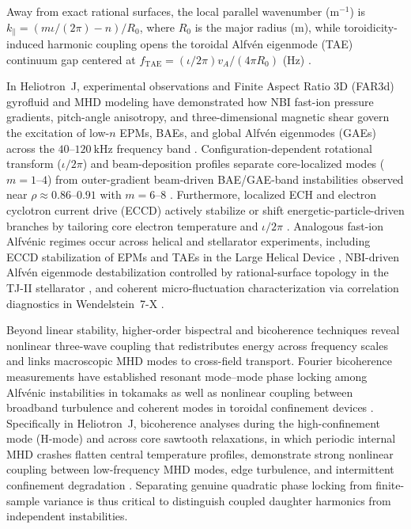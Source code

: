 \noindent Away from exact rational surfaces, the local parallel wavenumber ($\mathrm{m^{-1}}$) is $k_\parallel = (m\iota/(2\pi) - n)/R_0$, where $R_0$ is the major radius ($\mathrm{m}$), while toroidicity-induced harmonic coupling opens the toroidal Alfv\'en eigenmode (TAE) continuum gap centered at $f_{\mathrm{TAE}} = (\iota/2\pi)v_A/(4\pi R_0)$ ($\mathrm{Hz}$) \cite{Heidbrink2008, chen2016introduction, Varela2015}.

In Heliotron~J, experimental observations and Finite Aspect Ratio 3D (FAR3d) gyrofluid and MHD modeling have demonstrated how NBI fast-ion pressure gradients, pitch-angle anisotropy, and three-dimensional magnetic shear govern the excitation of low-$n$ EPMs, BAEs, and global Alfv\'en eigenmodes (GAEs) across the $40\text{--}120~\mathrm{kHz}$ frequency band \cite{Yamamoto_2020, Varela2015, Varela2024, Zhong2024}. Configuration-dependent rotational transform ($\iota/2\pi$) and beam-deposition profiles separate core-localized modes ($m = 1\text{--}4$) from outer-gradient beam-driven BAE/GAE-band instabilities observed near $\rho \approx 0.86\text{--}0.91$ with $m = 6\text{--}8$ \cite{zang2019observation, Varela2023, Zhong2024}. Furthermore, localized ECH and electron cyclotron current drive (ECCD) actively stabilize or shift energetic-particle-driven branches by tailoring core electron temperature and $\iota/2\pi$ \cite{zang2019observation, Varela2023, Adulsiriswad_2024}. Analogous fast-ion Alfv\'enic regimes occur across helical and stellarator experiments, including ECCD stabilization of EPMs and TAEs in the Large Helical Device \cite{Yamamoto_2020, Varela2015}, NBI-driven Alfv\'en eigenmode destabilization controlled by rational-surface topology in the TJ-II stellarator \cite{Varela2017}, and coherent micro-fluctuation characterization via correlation diagnostics in Wendelstein~7-X \cite{KraemerFlecken2024}.

Beyond linear stability, higher-order bispectral and bicoherence techniques reveal nonlinear three-wave coupling that redistributes energy across frequency scales and links macroscopic MHD modes to cross-field transport. Fourier bicoherence measurements have established resonant mode--mode phase locking among Alfv\'enic instabilities in tokamaks \cite{Hou2019} as well as nonlinear coupling between broadband turbulence and coherent modes in toroidal confinement devices \cite{Fujisawa2021}. Specifically in Heliotron~J, bicoherence analyses during the high-confinement mode (H-mode) and across core sawtooth relaxations, in which periodic internal MHD crashes flatten central temperature profiles, demonstrate strong nonlinear coupling between low-frequency MHD modes, edge turbulence, and intermittent confinement degradation \cite{Kin2025, Miyashita2025}. Separating genuine quadratic phase locking from finite-sample variance is thus critical to distinguish coupled daughter harmonics from independent instabilities.

